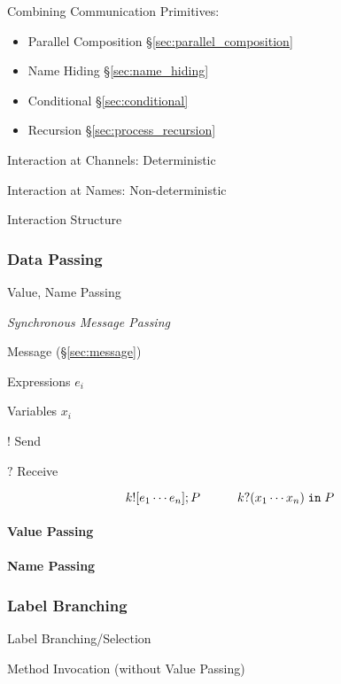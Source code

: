 Combining Communication Primitives:
\cite{honda-vasconcelos-kubo98}
\begin{itemize}
  \item Parallel Composition \S\ref{sec:parallel_composition}
  \item Name Hiding \S\ref{sec:name_hiding}
  \item Conditional \S\ref{sec:conditional}
  \item Recursion \S\ref{sec:process_recursion}
\end{itemize}


Interaction at Channels: Deterministic

Interaction at Names: Non-deterministic

Interaction Structure



\subsubsection{Data Passing}\label{sec:data_passing}

Value, Name Passing

\emph{Synchronous Message Passing}

Message (\S\ref{sec:message})

Expressions $e_i$

Variables $x_i$

$!$ Send

$?$ Receive

\[
    k![e_1 \cdots e_n]; P
    \quad\quad\quad
    k?(x_1 \cdots x_n) \; \mathtt{in} \; P
\]



\paragraph{Value Passing}\label{sec:value_passing}\hfill

\paragraph{Name Passing}\label{sec:name_passing}\hfill



\subsubsection{Label Branching}\label{sec:label_branching}

Label Branching/Selection

Method Invocation (without Value Passing)

